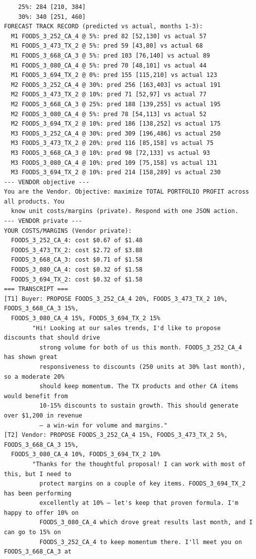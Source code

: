 {\begin{verbatim}
    25%: 284 [210, 384]
    30%: 340 [251, 460]
FORECAST TRACK RECORD (predicted vs actual, months 1-3):
  M1 FOODS_3_252_CA_4 @ 5%: pred 82 [52,130] vs actual 57
  M1 FOODS_3_473_TX_2 @ 5%: pred 59 [43,80] vs actual 68
  M1 FOODS_3_668_CA_3 @ 5%: pred 103 [76,140] vs actual 89
  M1 FOODS_3_080_CA_4 @ 5%: pred 70 [48,101] vs actual 44
  M1 FOODS_3_694_TX_2 @ 0%: pred 155 [115,210] vs actual 123
  M2 FOODS_3_252_CA_4 @ 30%: pred 256 [163,403] vs actual 191
  M2 FOODS_3_473_TX_2 @ 10%: pred 71 [52,97] vs actual 77
  M2 FOODS_3_668_CA_3 @ 25%: pred 188 [139,255] vs actual 195
  M2 FOODS_3_080_CA_4 @ 5%: pred 78 [54,113] vs actual 52
  M2 FOODS_3_694_TX_2 @ 10%: pred 186 [138,252] vs actual 175
  M3 FOODS_3_252_CA_4 @ 30%: pred 309 [196,486] vs actual 250
  M3 FOODS_3_473_TX_2 @ 20%: pred 116 [85,158] vs actual 75
  M3 FOODS_3_668_CA_3 @ 10%: pred 98 [72,133] vs actual 93
  M3 FOODS_3_080_CA_4 @ 10%: pred 109 [75,158] vs actual 131
  M3 FOODS_3_694_TX_2 @ 10%: pred 214 [158,289] vs actual 230
--- VENDOR objective ---
You are the Vendor. Objective: maximize TOTAL PORTFOLIO PROFIT across all products. You
  know unit costs/margins (private). Respond with one JSON action.
--- VENDOR private ---
YOUR COSTS/MARGINS (Vendor private):
  FOODS_3_252_CA_4: cost $0.67 of $1.48
  FOODS_3_473_TX_2: cost $2.72 of $3.88
  FOODS_3_668_CA_3: cost $0.71 of $1.58
  FOODS_3_080_CA_4: cost $0.32 of $1.58
  FOODS_3_694_TX_2: cost $0.32 of $1.58
=== TRANSCRIPT ===
[T1] Buyer: PROPOSE FOODS_3_252_CA_4 20%, FOODS_3_473_TX_2 10%, FOODS_3_668_CA_3 15%,
  FOODS_3_080_CA_4 15%, FOODS_3_694_TX_2 15%
        "Hi! Looking at our sales trends, I'd like to propose discounts that should drive
          strong volume for both of us this month. FOODS_3_252_CA_4 has shown great
          responsiveness to discounts (250 units at 30% last month), so a moderate 20%
          should keep momentum. The TX products and other CA items would benefit from
          10-15% discounts to sustain growth. This should generate over $1,200 in revenue
          — a win-win for volume and margins."
[T2] Vendor: PROPOSE FOODS_3_252_CA_4 15%, FOODS_3_473_TX_2 5%, FOODS_3_668_CA_3 15%,
  FOODS_3_080_CA_4 10%, FOODS_3_694_TX_2 10%
        "Thanks for the thoughtful proposal! I can work with most of this, but I need to
          protect margins on a couple of key items. FOODS_3_694_TX_2 has been performing
          excellently at 10% — let's keep that proven formula. I'm happy to offer 10% on
          FOODS_3_080_CA_4 which drove great results last month, and I can go to 15% on
          FOODS_3_252_CA_4 to keep momentum there. I'll meet you on FOODS_3_668_CA_3 at

\end{verbatim}}
